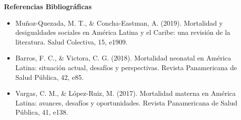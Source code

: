 \documentclass[8pt,a4paper]{beamer}
\begin{document}
{\begin{frame}{\textbf{Referencias Bibliográficas}}
\begin{itemize}
\item Muñoz-Quezada, M. T., \& Concha-Eastman, A. (2019). Mortalidad y desigualdades sociales en América Latina y el Caribe: una revisión de la literatura. Salud Colectiva, 15, e1909.

\item Barros, F. C., \& Victora, C. G. (2018). Mortalidad neonatal en América Latina: situación actual, desafíos y perspectivas. Revista Panamericana de Salud Pública, 42, e85.

\item Vargas, C. M., \& López-Ruiz, M. (2017). Mortalidad materna en América Latina: avances, desafíos y oportunidades. Revista Panamericana de Salud Pública, 41, e138.
\end{itemize}

\end{frame}

}
\end{document}
